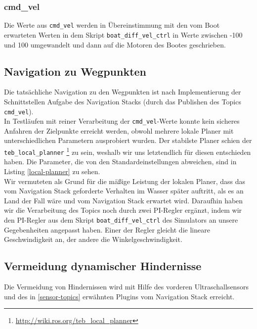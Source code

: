 \documentclass[11pt]{article}
\begin{document}
\subsubsection{cmd\_vel} \label{cmd}
Die Werte aus \texttt{cmd\_vel} werden in Übereinstimmung mit den vom Boot erwarteten Werten in dem Skript \texttt{boat\_diff\_vel\_ctrl} in Werte zwischen -100 und 100 umgewandelt und dann auf die Motoren des Bootes geschrieben.

\subsection{Navigation zu Wegpunkten}

Die tatsächliche Navigation zu den Wegpunkten ist nach Implementierung der Schnittstellen Aufgabe des Navigation Stacks (durch das Publishen des Topics \texttt{cmd\_vel}).\\
In Testläufen mit reiner Verarbeitung der \texttt{cmd\_vel}-Werte konnte kein sicheres Anfahren der Zielpunkte erreicht werden, obwohl mehrere lokale Planer mit unterschiedlichen Parametern ausprobiert wurden. Der stabilste Planer schien der \texttt{teb\_local\_planner} \footnote{\url{http://wiki.ros.org/teb_local_planner}} zu sein, weshalb wir uns letztendlich für diesen entschieden haben. Die Parameter, die von den Standardeinstellungen abweichen, sind in Listing \ref{local-planner} zu sehen.\\

Wir vermuteten als Grund für die mäßige Leistung der lokalen Planer, dass das vom Navigation Stack geforderte Verhalten im Wasser später auftritt, als es an Land der Fall wäre und vom Navigation Stack erwartet wird. Daraufhin haben wir die Verarbeitung des Topics noch durch zwei PI-Regler ergänzt, indem wir den PI-Regler aus dem Skript \texttt{boat\_diff\_vel\_ctrl} des Simulators an unsere Gegebenheiten angepasst haben. Einer der Regler gleicht die lineare Geschwindigkeit an, der andere die Winkelgeschwindigkeit.

\subsection{Vermeidung dynamischer Hindernisse}
Die Vermeidung von Hindernissen wird mit Hilfe des vorderen Ultraschallsensors und des in \ref{sensor-topics} erwähnten Plugins vom Navigation Stack erreicht.
\end{document}
